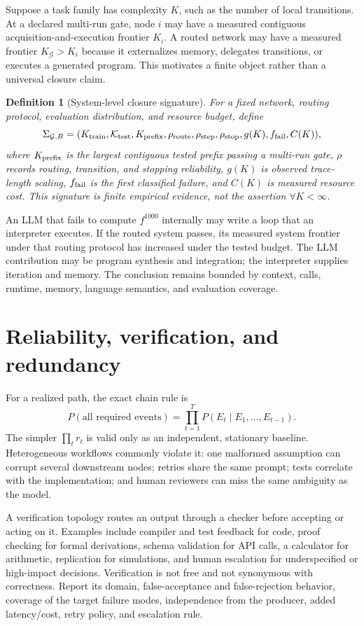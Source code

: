 \documentclass[10pt]{article}
\newtheorem{definition}{Definition}
\begin{document}
Suppose a task family has complexity $K$, such as the number of local transitions. At a declared multi-run gate, node $i$ may have a measured contiguous acquisition-and-execution frontier $K_i$. A routed network may have a measured frontier $K_{\mathcal G}>K_i$ because it externalizes memory, delegates transitions, or executes a generated program. This motivates a finite object rather than a universal closure claim.

\begin{definition}[System-level closure signature]
For a fixed network, routing protocol, evaluation distribution, and resource budget, define
\[
\Sigma_{\mathcal G,B}=(K_{\rm train},\mathcal K_{\rm test},K_{\rm prefix},
\rho_{\rm route},\rho_{\rm step},\rho_{\rm stop},g(K),f_{\rm fail},C(K)),
\]
where $K_{\rm prefix}$ is the largest contiguous tested prefix passing a multi-run gate, $\rho$ records routing, transition, and stopping reliability, $g(K)$ is observed trace-length scaling, $f_{\rm fail}$ is the first classified failure, and $C(K)$ is measured resource cost. This signature is finite empirical evidence, not the assertion $\forall K<\infty$.
\end{definition}

An LLM that fails to compute $f^{1000}$ internally may write a loop that an interpreter executes. If the routed system passes, its measured system frontier under that routing protocol has increased under the tested budget. The LLM contribution may be program synthesis and integration; the interpreter supplies iteration and memory. The conclusion remains bounded by context, calls, runtime, memory, language semantics, and evaluation coverage.

\section{Reliability, verification, and redundancy}

For a realized path, the exact chain rule is
\[
P(\text{all required events})=\prod_{t=1}^{T}
P(E_t\mid E_1,\ldots,E_{t-1}).
\]
The simpler $\prod_t r_t$ is valid only as an independent, stationary baseline. Heterogeneous workflows commonly violate it: one malformed assumption can corrupt several downstream nodes; retries share the same prompt; tests correlate with the implementation; and human reviewers can miss the same ambiguity as the model.

A verification topology routes an output through a checker before accepting or acting on it. Examples include compiler and test feedback for code, proof checking for formal derivations, schema validation for API calls, a calculator for arithmetic, replication for simulations, and human escalation for underspecified or high-impact decisions. Verification is not free and not synonymous with correctness. Report its domain, false-acceptance and false-rejection behavior, coverage of the target failure modes, independence from the producer, added latency/cost, retry policy, and escalation rule.
\end{document}

